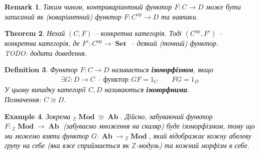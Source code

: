\documentclass[a4paper, 10pt]{article}
\theoremstyle{theoremdd}
\newtheorem{theorem}{Theorem}[subsection]
\newtheorem{definition}[theorem]{Definition}
\newtheorem{example}[theorem]{Example}
\newtheorem{remark}[theorem]{Remark}
\DeclareMathOperator{\Set}{\textbf{Set}}
\DeclareMathOperator{\Ab}{\textbf{Ab}}
\DeclareMathOperator{\Mod}{\textbf{Mod}}
\begin{document}
\begin{remark}
Таким чином, контраваріантний функтор $F \colon C \to D$ може бути записаний як (коваріантний) функтор $F \colon C^{\text{op}} \to D$ та навпаки.
\end{remark}

\begin{theorem}
Нехай $(C,F)$ -- конкретна категорія. Тоді $(C^{\text{op}},F')$ -- конкретна категорія, де $F' \colon C^{\text{op}} \to \Set$ -- деякий (точний) функтор.\\
\textit{TODO: додати доведення.}
\end{theorem}

\begin{definition}
Функтор $F \colon C \to D$ називається \textbf{ізоморфізмом}, якщо
\begin{align*}
\exists G \colon D \to C \text{ -- функтор}: GF = 1_C \qquad FG = 1_D
\end{align*}
У цьому випадку категорії $C,D$ називаються \textbf{ізоморфними}.\\
Позначення: $C \cong D$.
\end{definition}

\begin{example}
Зокрема ${}_{\mathbb{Z}}\Mod \cong \Ab$. Дійсно, забуваючий функтор $F \colon {}_{\mathbb{Z}}\Mod  \to \Ab$ (забуваємо множення на скаляр) буде ізоморфізмом, тому що ми можемо взяти функтор $G \colon \Ab \to {}_{\mathbb{Z}}\Mod$, який відображає кожну абелеву групу на себе (яка вже сприймається як $\mathbb{Z}$-модуль) та кожний морфізм в себе.
\end{example}
\end{document}
